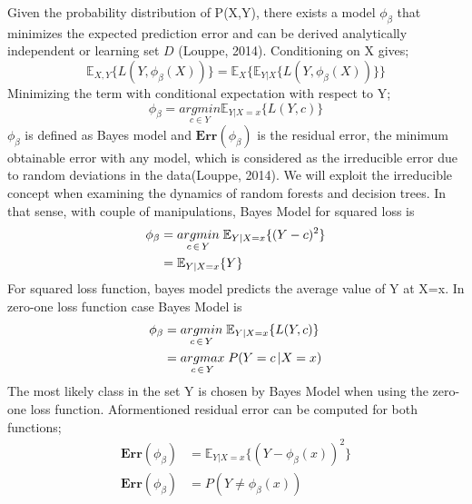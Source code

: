 Given the probability distribution of P(X,Y), there exists a model $\phi_{\beta}$ that minimizes the expected prediction error and can be derived analytically independent or learning set $D$ (Louppe, 2014). Conditioning on X gives;
\begin{equation}
\mathbb{E}_{X,Y} \{L(Y, \phi_{\beta}(X))\} = \mathbb{E}_{X}\{\mathbb{E}_{Y|X}\{L(Y, \phi_{\beta}(X)) \} \}
\end{equation}
Minimizing the term with conditional expectation with respect to Y;
\begin{equation}
\phi_{\beta} = \underset{c \in Y}{argmin} \mathbb{E}_{Y|X=x}\{L(Y,c)\}
\end{equation}
$\phi_{\beta}$ is defined as Bayes model and $\boldsymbol{Err}(\phi_{\beta})$ is the residual error, the minimum obtainable error with any model, which is considered as the irreducible error due to random deviations in the data(Louppe, 2014). We will exploit the irreducible concept when examining the dynamics of random forests and decision trees. In that sense, with couple of manipulations, Bayes Model for squared loss is
\begin{align}
\phi_{\beta} & = \underset{c \,\in\, Y}{argmin} \; \mathbb{E}_{Y|X=x}\{(Y-c)^2 \} \notag\\
			 & = \mathbb{E}_{Y|X=x}\{Y\}
\end{align}
For squared loss function, bayes model predicts the average value of Y at X=x. In zero-one loss function case Bayes Model is
\begin{align}\label{eq:bayes_model}
\phi_{\beta} & = \underset{c \,\in\, Y}{argmin} \; \mathbb{E}_{Y|X=x}\{L(Y,c) \} \notag\\
			 & = \underset{c \,\in\, Y}{argmax} \; P(Y = c \,| X = x)
\end{align}
The most likely class in the set Y is chosen by Bayes Model when using the zero-one loss function. Aformentioned residual error can be computed for both functions;
\begin{align}
\boldsymbol{Err}(\phi_{\beta}) & = \mathbb{E}_{Y|X=x}\{(Y-\phi_{\beta}(x))^2 \}\\
\boldsymbol{Err}(\phi_{\beta}) & = P(Y \neq \phi_{\beta}(x) )
\end{align}

